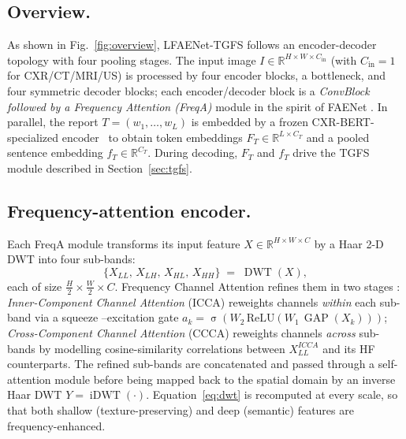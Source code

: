 \documentclass[runningheads]{llncs}
\newcommand{\method}{LFAENet-TGFS\xspace}
\newcommand{\tgfs}{TGFS\xspace}
\newcommand{\freqa}{FreqA\xspace}
\DeclareMathOperator{\sigmoid}{\sigma}
\DeclareMathOperator{\DWT}{DWT}
\DeclareMathOperator{\iDWT}{iDWT}
\DeclareMathOperator{\GAP}{GAP}
\begin{document}
\subsection{Overview.}
As shown in Fig.~\ref{fig:overview}, \method follows an
encoder-decoder topology with four pooling stages. The input image
$I\in\mathbb{R}^{H\times W\times C_{\text{in}}}$ (with
$C_{\text{in}}=1$ for CXR/CT/MRI/US) is processed by four encoder
blocks, a bottleneck, and four symmetric decoder blocks; each
encoder/decoder block is a \emph{ConvBlock followed by a Frequency
Attention (\freqa)} module in the spirit of FAENet
\cite{zhong2025faenet}. In parallel, the report
$T=(w_1,\dots,w_L)$ is embedded by a frozen CXR-BERT-specialized
encoder~\cite{boecking2022cxrbert} to obtain token embeddings
$F_T\in\mathbb{R}^{L\times C_T}$ and a pooled sentence embedding
$f_T\in\mathbb{R}^{C_T}$. During decoding, $F_T$ and $f_T$ drive the
\tgfs module described in Section~\ref{sec:tgfs}.

\subsection{Frequency-attention encoder.}
\label{sec:enc}
Each \freqa module transforms its input feature
$X\in\mathbb{R}^{H\times W\times C}$ by a Haar 2-D DWT into four
sub-bands:
\begin{equation}
\{X_{LL},\,X_{LH},\,X_{HL},\,X_{HH}\}\;=\;\DWT(X),
\label{eq:dwt}
\end{equation}
each of size $\tfrac{H}{2}\!\times\!\tfrac{W}{2}\!\times\!C$. Frequency
Channel Attention refines them in two stages
\cite{zhong2025faenet}: \emph{Inner-Component Channel Attention}
(ICCA) reweights channels \emph{within} each sub-band via a squeeze
--excitation gate
$a_k=\sigmoid(W_2\,\mathrm{ReLU}(W_1\,\GAP(X_k)))$;
\emph{Cross-Component Channel Attention} (CCCA) reweights channels
\emph{across} sub-bands by modelling cosine-similarity correlations
between $X_{LL}^{ICCA}$ and its HF counterparts. The refined
sub-bands are concatenated and passed through a self-attention
module before being mapped back to the spatial domain by an inverse
Haar DWT $Y=\iDWT(\cdot)$. Equation~\eqref{eq:dwt} is recomputed at
every scale, so that both shallow (texture-preserving) and deep
(semantic) features are frequency-enhanced.
\end{document}
